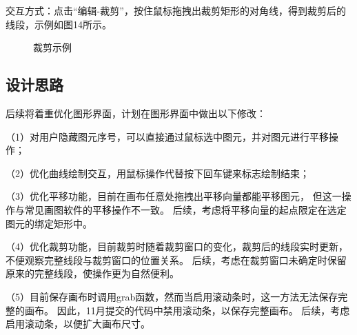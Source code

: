 \documentclass[a4paper,UTF8]{article}
\begin{document}
交互方式：点击“编辑-裁剪”，按住鼠标拖拽出裁剪矩形的对角线，得到裁剪后的线段，示例如图14所示。
\begin{figure}[H]
    \centering
        \caption{裁剪示例}
\end{figure}



\subsection{设计思路}
后续将着重优化图形界面，计划在图形界面中做出以下修改：

（1）对用户隐藏图元序号，可以直接通过鼠标选中图元，并对图元进行平移操作；

（2）优化曲线绘制交互，用鼠标操作代替按下回车键来标志绘制结束；

（3）优化平移功能，目前在画布任意处拖拽出平移向量都能平移图元，
但这一操作与常见画图软件的平移操作不一致。
后续，考虑将平移向量的起点限定在选定图元的绑定矩形中。

（4）优化裁剪功能，目前裁剪时随着裁剪窗口的变化，裁剪后的线段实时更新，
不便观察完整线段与裁剪窗口的位置关系。
后续，考虑在裁剪窗口未确定时保留原来的完整线段，使操作更为自然便利。

（5）目前保存画布时调用grab函数，然而当启用滚动条时，这一方法无法保存完整的画布。
因此，11月提交的代码中禁用滚动条，以保存完整画布。
后续，考虑启用滚动条，以便扩大画布尺寸。
\end{document}
